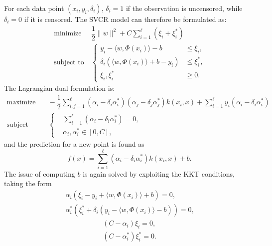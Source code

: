 \documentclass[12pt]{report}
\begin{document}
For each data point $(x_{i}, y_{i}, \delta_{i})$, $\delta_{i} = 1$ if the observation is uncensored, while $\delta_{i} = 0$ if it is censored. The SVCR model can therefore be formulated as:
\begin{equation} \label{svcrprimal}
\begin{split}
\text{minimize} &\ \dfrac{1}{2}\| w \|^2 + C\sum_{i=1}^{\ell}(\xi_{i} + \xi_{i}^{*}) \\
\text{subject to} &\ \begin{cases}
y_{i} - \langle w,\Phi(x_{i}) \rangle - b &\leq \xi_{i} \text{,}\\
\delta_{i}(\langle w,\Phi(x_{i}) \rangle + b - y_{i}) &\leq \xi_{i}^{*} \text{,}\\
\xi_{i}, \xi_{i}^{*} &\geq 0 \text{.}
\end{cases}
\end{split}
\end{equation}
The Lagrangian dual formulation is:
\begin{equation} \label{svcrdual}
\begin{split}
\text{maximize} &\quad
-\dfrac{1}{2}\sum_{i,j=1}^{\ell}(\alpha_{i} - \delta_{i}\alpha_{i}^{*})(\alpha_{j} - \delta_{j}\alpha_{j}^{*})k(x_{i},x) + \sum_{i=1}^{\ell}y_{i}(\alpha_{i}-\delta_{i}\alpha_{i}^{*}) \\
\text{subject to} &\quad \left\{\begin{split}
&\sum_{i=1}^{\ell}(\alpha_{i} - \delta_{i}\alpha_{i}^{*}) = 0 \text{,}\\
&\alpha_{i},\alpha_{i}^{*} \in [0,C] \text{,}
\end{split}\right.
\end{split}
\end{equation}
and the prediction for a new point is found as
\begin{equation} \label{svcrf}
f(x) = \sum_{i=1}^{\ell}(\alpha_{i}-\delta_{i}\alpha_{i}^{*})k(x_{i},x) + b \text{.}
\end{equation}
The issue of computing $b$ is again solved by exploiting the KKT conditions, taking the form
\begin{equation} \label{svcrkkt1}
\begin{split}
\alpha_{i}(\xi_{i} - y_{i} + \langle w,\Phi(x_{i})\rangle + b) = 0 \text{,}\\
\alpha_{i}^{*}(\xi_{i}^{*} + \delta_{i}(y_{i} - \langle w,\Phi(x_{i})\rangle - b)) = 0 \text{,}
\end{split}
\end{equation}
\begin{equation} \label{svcrkkt2}
\begin{split}
(C - \alpha_{i})\xi_{i} = 0 \text{,}\\
(C - \alpha_{i}^{*})\xi_{i}^{*} = 0 \text{.}
\end{split}
\end{equation}
\end{document}
